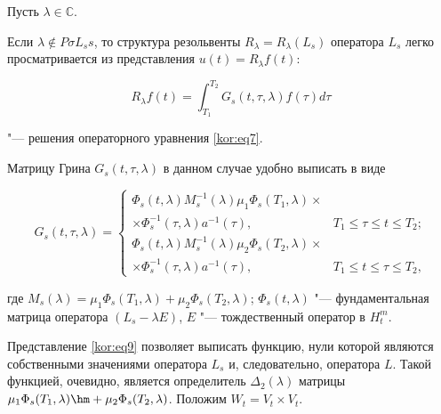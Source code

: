 Пусть $\lambda\in\mathbb{C}$. 

Если $\lambda\notin P\sigma L_s s$, то структура резольвенты $R_\lambda=R_\lambda(L_s)$ оператора $L_s$ легко просматривается из представления $u(t)=R_\lambda f(t)$:

\begin{equation}

\label{kor:eq8}

R_\lambda f(t)=\int_{T_1}^{T_2}{G_s(t,\tau,\lambda)f(\tau)d\tau} 

\end{equation}

"--- решения операторного уравнения \eqref{kor:eq7}. 

Матрицу Грина $G_s(t,\tau,\lambda)$ в данном случае удобно выписать в виде

\begin{equation}

\label{kor:eq9}

G_s(t,\tau,\lambda)=\left\{ 

\begin{array}{rl}

\Phi_s(t,\lambda)M_s^{-1}(\lambda)\mu_1\Phi_s(T_1,\lambda)\times & \\

\times\Phi_s^{-1}(\tau,\lambda)a^{-1}(\tau), & T_1\le\tau\le t\le T_2;

\\[2mm]

\Phi_s(t,\lambda)M_s^{-1}(\lambda)\mu_2\Phi_s(T_2,\lambda)\times & \\

\times\Phi_s^{-1}(\tau,\lambda)a^{-1}(\tau), & T_1\le t\le\tau\le T_2,

\end{array}\right.

\end{equation}

где $M_s(\lambda)=\mu_1\Phi_s(T_1,\lambda)+\mu_2\Phi_s(T_2,\lambda)$; $\Phi_s(t,\lambda)$ "--- фундаментальная матрица оператора $(L_s-\lambda E)$,   $E$ "--- тождественный оператор в $H_t^m$.



Представление \eqref{kor:eq9} позволяет выписать функцию, нули которой являются собственными значениями оператора $L_s$ и, следовательно, оператора $L$. Такой функцией, очевидно, является определитель $\Delta_2(\lambda)$ матрицы $\mu_1\Phi_s(T_1,\lambda)\hm +\mu_2\Phi_s(T_2,\lambda)$. Положим $W_t=V_t\times V_t$.





